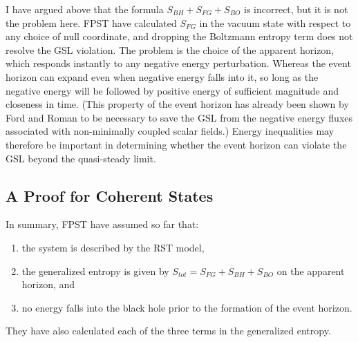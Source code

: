 \documentclass[12pt]{article}
\begin{document}
I have argued above that the formula $S_{BH} + S_{FG} + S_{BO}$ is incorrect, but it is not the problem here.  FPST have calculated $S_{FG}$ in the vacuum state with respect to any choice of null coordinate, and dropping the Boltzmann entropy term does not resolve the GSL violation.  The problem is the choice of the apparent horizon, which responds instantly to any negative energy perturbation.  Whereas the event horizon can expand even when negative energy falls into it, so long as the negative energy will be followed by positive energy of sufficient magnitude and closeness in time.  (This property of the event horizon has already been shown by Ford and Roman \cite{FR01} to be necessary to save the GSL from the negative energy fluxes associated with non-minimally coupled scalar fields.)  Energy inequalities may therefore be important in determining whether the event horizon can violate the GSL beyond the quasi-steady limit.

\subsection{A Proof for Coherent States}

In summary, FPST have assumed so far that:
\begin{enumerate}
\item the system is described by the RST model,
\item the generalized entropy is given by $S_{tot} = S_{FG} + S_{BH} + S_{BO}$ on the apparent horizon, and
\item no energy falls into the black hole prior to the formation of the event horizon.
\end{enumerate}
They have also calculated each of the three terms in the generalized entropy.
\end{document}

